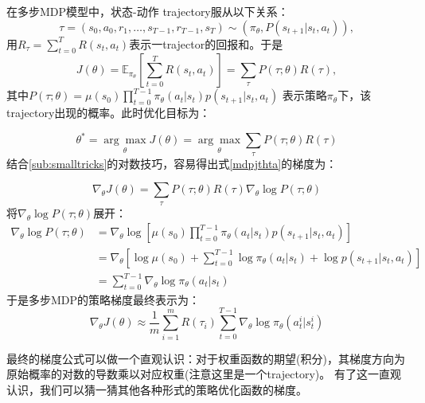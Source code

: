 \documentclass[UTF8]{ctexart}
\begin{document}
在多步MDP模型中，状态-动作 trajectory服从以下关系：
$$\tau = (s_0, a_0, r_1, 
\ldots, s_{T-1}, r_{T-1}, s_T) \sim (\pi_{\theta},
P(s_{t+1}|s_{t}, a_t)),$$
用$R_{\tau}=\sum_{t=0}^{T}R(s_t, a_t)$表示一trajector的回报和。于是
\begin{equation}\label{mdpjthta} J(\theta)=\mathbb{E}_{\pi_{\theta}}\left[\sum_{t=0}^{T} R\left(s_{t}, 
a_{t}\right)\right]=\sum_{\tau} P(\tau ; \theta) R(\tau),\end{equation}
其中$P(\tau ; \theta)=\mu\left(s_{0}\right) \prod_{t=0}^{T-1} \pi_{\theta}\left(a_{t} | s_{t}\right) p\left(s_{t+1} | s_{t}, a_{t}\right)$
表示策略$\pi_{\theta}$下，该trajectory出现的概率。此时优化目标为：

\begin{equation}\theta^{*}=\underset{\theta}{\arg \max } J(\theta)=
\underset{\theta}{\arg \max } \sum_{\tau} P(\tau ; \theta) R(\tau)\end{equation}
结合\ref{sub:smalltricks}的对数技巧，容易得出式\eqref{mdpjthta}的梯度为：

\begin{equation}\nabla_{\theta} J(\theta)=\sum_{\tau} P(\tau ; \theta) R(\tau) \nabla_{\theta} \log P(\tau ; \theta)\end{equation}
将$\nabla_{\theta} \log P(\tau ; \theta)$展开：
\begin{equation}\begin{aligned}
    \nabla_{\theta} \log P(\tau ; \theta) &=\nabla_{\theta} \log \left[\mu\left(s_{0}\right) \prod_{t=0}^{T-1} \pi_{\theta}\left(a_{t} | s_{t}\right) p\left(s_{t+1} | s_{t}, a_{t}\right)\right] \\
    &=\nabla_{\theta}\left[\log \mu\left(s_{0}\right)+\sum_{t=0}^{T-1} \log \pi_{\theta}\left(a_{t} | s_{t}\right)+\log p\left(s_{t+1} | s_{t}, a_{t}\right)\right] \\
    &=\sum_{t=0}^{T-1} \nabla_{\theta} \log \pi_{\theta}\left(a_{t} | s_{t}\right)
    \end{aligned}
\end{equation}
于是多步MDP的策略梯度最终表示为：
\begin{equation}
\nabla_{\theta} J(\theta) \approx \frac{1}{m} \sum_{i=1}^{m} R\left(\tau_{i}\right) \sum_{t=0}^{T-1} \nabla_{\theta} 
\log \pi_{\theta}\left(a_{t}^{i} | s_{t}^{i}\right)
\end{equation}

最终的梯度公式可以做一个直观认识：{\color{red}对于权重函数的期望(积分)，其梯度方向为原始概率的对数的导数乘以对应权重(注意这里是一个trajectory)}。
有了这一直观认识，我们可以猜一猜其他各种形式的策略优化函数的梯度。
\end{document}
